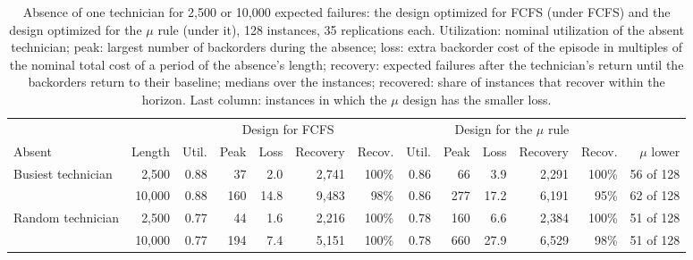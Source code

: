 \begin{table}[!htb]
\centering
\caption{Absence of one technician for 2,500 or 10,000 expected failures: the design optimized for FCFS (under FCFS) and the design optimized for the $\mu$ rule (under it), 128 instances, 35 replications each. Utilization: nominal utilization of the absent technician; peak: largest number of backorders during the absence; loss: extra backorder cost of the episode in multiples of the nominal total cost of a period of the absence's length; recovery: expected failures after the technician's return until the backorders return to their baseline; medians over the instances; recovered: share of instances that recover within the horizon. Last column: instances in which the $\mu$ design has the smaller loss.}
\label{tab:absence}
\small
\setlength{\tabcolsep}{3.5pt}
\begin{tabular}{@{}lr rrrrr rrrrr r@{}}
\toprule
& & \multicolumn{5}{c}{Design for FCFS} & \multicolumn{5}{c}{Design for the $\mu$ rule} & \\
\cmidrule(lr){3-7}\cmidrule(lr){8-12}
Absent & Length & Util. & Peak & Loss & Recovery & Recov. & Util. & Peak & Loss & Recovery & Recov. & $\mu$ lower \\
\midrule
Busiest technician & 2,500 & 0.88 & 37 & 2.0 & 2,741 & 100\% & 0.86 & 66 & 3.9 & 2,291 & 100\% & 56 of 128 \\
 & 10,000 & 0.88 & 160 & 14.8 & 9,483 & 98\% & 0.86 & 277 & 17.2 & 6,191 & 95\% & 62 of 128 \\
\midrule
Random technician & 2,500 & 0.77 & 44 & 1.6 & 2,216 & 100\% & 0.78 & 160 & 6.6 & 2,384 & 100\% & 51 of 128 \\
 & 10,000 & 0.77 & 194 & 7.4 & 5,151 & 100\% & 0.78 & 660 & 27.9 & 6,529 & 98\% & 51 of 128 \\
\bottomrule
\end{tabular}
\end{table}

